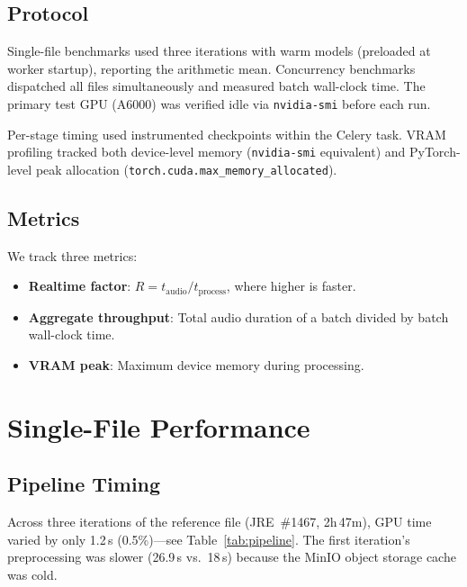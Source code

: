 \documentclass[conference,10pt]{IEEEtran}
\begin{document}
\subsection{Protocol}

Single-file benchmarks used three iterations with warm models (preloaded at
worker startup), reporting the arithmetic mean. Concurrency benchmarks dispatched
all files simultaneously and measured batch wall-clock time. The primary test GPU
(A6000) was verified idle via \texttt{nvidia-smi} before each run.

Per-stage timing used instrumented checkpoints within the Celery task. VRAM
profiling tracked both device-level memory (\texttt{nvidia-smi} equivalent) and
PyTorch-level peak allocation (\texttt{torch.cuda.max\_memory\_allocated}).

\subsection{Metrics}

We track three metrics:
\begin{itemize}[nosep,leftmargin=*]
  \item \textbf{Realtime factor}: $R = t_{\text{audio}} / t_{\text{process}}$,
    where higher is faster.
  \item \textbf{Aggregate throughput}: Total audio duration of a batch divided
    by batch wall-clock time.
  \item \textbf{VRAM peak}: Maximum device memory during processing.
\end{itemize}

\section{Single-File Performance}

\subsection{Pipeline Timing}

Across three iterations of the reference file (JRE~\#1467, 2h\,47m), GPU time
varied by only 1.2\,s (0.5\%)---see Table~\ref{tab:pipeline}. The first
iteration's preprocessing was slower (26.9\,s vs.\ 18\,s) because the MinIO
object storage cache was cold.
\end{document}

